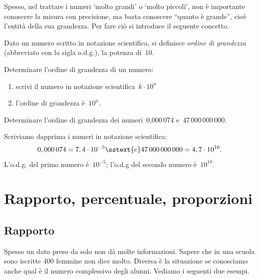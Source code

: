 Spesso, nel trattare i numeri `molto grandi' o `molto piccoli', non è 
importante conoscere la misura con precisione, ma basta conoscere 
``quanto è grande'', cioè l'entità della sua grandezza. 
Per fare ciò si introduce il seguente concetto.

\begin{definizione}{}{}
Dato un numero scritto in notazione scientifica, si definisce 
\emph{ordine di grandezza} (abbreviato con la sigla o.d.g.),
la potenza di~\(10\).
\end{definizione}

\begin{procedura}{}{}
Determinare l'ordine di grandezza di un numero:
\begin{enumerate}[noitemsep, label=(\alph*)]
\item scrivi il numero in notazione scientifica~\({k\cdot10^n}\)
\item l'ordine di grandezza è~\(10^{n}\).
\end{enumerate}
\end{procedura}



 \begin{esempio}{}{}
Determinare l'ordine di grandezza dei numeri~0,000\,074 e~47\,000\,000\,000.

Scriviamo dapprima i numeri in notazione scientifica:
\[0,000\,074 = 7,4\cdot 10^{-5} \sstext{ e } 
  47\,000\,000\,000 = 4,7\cdot 10^{10}.\]
L'o.d.g. del primo numero è~\(10^{-5}\); \qquad 
l'o.d.g del secondo numero è~\(10^{10}\).
 \end{esempio}



\section{Rapporto, percentuale, proporzioni}
\label{sec:razionali_rapporto}

\subsection{Rapporto}

Spesso un dato preso da solo non dà molte informazioni. 
Sapere che in una 
scuola sono iscritte 400 femmine non dice molto. Diversa è la situazione se 
conosciamo anche qual è il numero complessivo degli alunni.
Vediamo i seguenti due esempi.

